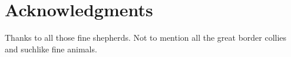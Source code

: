 \documentclass[oneside]{book}
\begin{document}
\chapter*{Acknowledgments}             %
  Thanks to all those fine shepherds. Not to mention all the great
  border collies and suchlike fine animals.



\cleardoublepage
{}
{}



\clearpage
\tableofcontents				 %
\clearpage
\listoffigures                  %
\clearpage
\listoftables                   %



\mainmatter   %

\def \spo2{ \texorpdfstring{(SpO$_{2}$)}{SpO2}}













\backmatter  %




%


\end{document}
